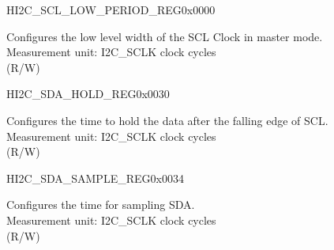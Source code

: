 \begin{register}{H}{I2C\_SCL\_LOW\_PERIOD\_REG}{0x0000}\label{regdesc:I2CSCLLOWPERIODREG}
%
%
\regnewline%
\begin{regdesc}\begin{reglist}
\label{fielddesc:I2CSCLLOWPERIOD}\item [I2C\_SCL\_LOW\_PERIOD] Configures the low level width of the SCL Clock in master mode. \\
Measurement unit: I2C\_SCLK clock cycles \\ (R/W)
\end{reglist}\end{regdesc}
\end{register}


\begin{register}{H}{I2C\_SDA\_HOLD\_REG}{0x0030}\label{regdesc:I2CSDAHOLDREG}
%
%
\regnewline%
\begin{regdesc}\begin{reglist}
\label{fielddesc:I2CSDAHOLDTIME}\item [I2C\_SDA\_HOLD\_TIME] Configures the time to hold the data after the falling edge of SCL.\\
Measurement unit: I2C\_SCLK clock cycles \\ (R/W)
\end{reglist}\end{regdesc}
\end{register}


\begin{register}{H}{I2C\_SDA\_SAMPLE\_REG}{0x0034}\label{regdesc:I2CSDASAMPLEREG}
%
%
\regnewline%
\begin{regdesc}\begin{reglist}
\label{fielddesc:I2CSDASAMPLETIME}\item [I2C\_SDA\_SAMPLE\_TIME] Configures the time for sampling SDA.\\
Measurement unit: I2C\_SCLK clock cycles \\ (R/W)
\end{reglist}\end{regdesc}
\end{register}



